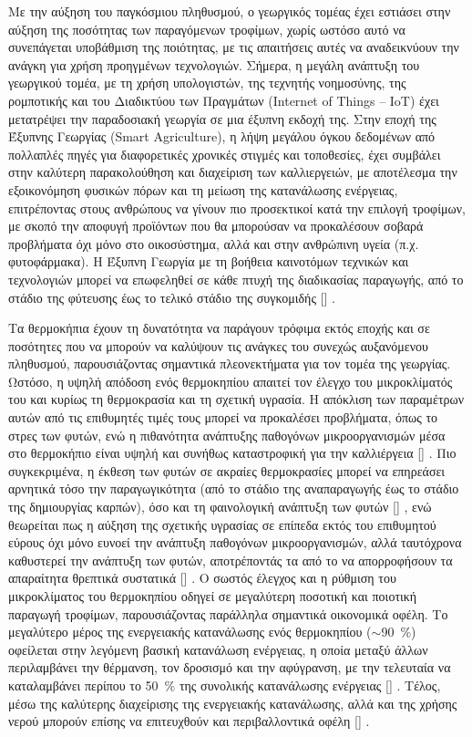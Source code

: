 \documentclass[12pt, a4paper]{report} %
\DeclareRobustCommand{\lcitep}[1]{%
  \english{[\cite{#1}]}%
}
\newcommand{\english}{\foreignlanguage{english}}
\begin{document}
Με την αύξηση του παγκόσμιου πληθυσμού, ο γεωργικός τομέας έχει εστιάσει στην αύξηση της ποσότητας των 
παραγόμενων τροφίμων, χωρίς ωστόσο αυτό να συνεπάγεται υποβάθμιση της ποιότητας, με τις απαιτήσεις αυτές 
να αναδεικνύουν την ανάγκη για χρήση προηγμένων τεχνολογιών. Σήμερα, η μεγάλη ανάπτυξη του γεωργικού τομέα, 
με τη χρήση υπολογιστών, της τεχνητής νοημοσύνης, της ρομποτικής και του Διαδικτύου των Πραγμάτων 
(\english{Internet of Things – IoT}) έχει μετατρέψει την παραδοσιακή γεωργία σε μια έξυπνη εκδοχή της. 
Στην εποχή της Έξυπνης Γεωργίας (\english{Smart Agriculture}), η λήψη μεγάλου όγκου δεδομένων από πολλαπλές 
πηγές για διαφορετικές χρονικές στιγμές και τοποθεσίες, έχει συμβάλει στην καλύτερη παρακολούθηση και 
διαχείριση των καλλιεργειών, με αποτέλεσμα την εξοικονόμηση φυσικών πόρων και τη μείωση της κατανάλωσης 
ενέργειας, επιτρέποντας στους ανθρώπους να γίνουν πιο προσεκτικοί κατά την επιλογή τροφίμων, με σκοπό την 
αποφυγή προϊόντων που θα μπορούσαν να προκαλέσουν σοβαρά προβλήματα όχι μόνο στο οικοσύστημα, αλλά και στην 
ανθρώπινη υγεία (π.χ. φυτοφάρμακα). Η Έξυπνη Γεωργία με τη βοήθεια καινοτόμων τεχνικών και τεχνολογιών 
μπορεί να επωφεληθεί σε κάθε πτυχή της διαδικασίας παραγωγής, από το στάδιο της φύτευσης έως το τελικό 
στάδιο της συγκομιδής \lcitep{eisagwgi_NN_bib1}.

Τα θερμοκήπια έχουν τη δυνατότητα να παράγουν τρόφιμα εκτός εποχής και σε ποσότητες που να μπορούν να 
καλύψουν τις ανάγκες του συνεχώς αυξανόμενου πληθυσμού, παρουσιά\-ζοντας σημαντικά πλεονεκτήματα για τον τομέα 
της γεωργίας. Ωστόσο, η υψηλή απόδοση ενός θερμοκηπίου απαιτεί τον έλεγχο του μικροκλίματός του και κυρίως 
τη θερμοκρασία και τη σχετική υγρασία. Η απόκλιση των παραμέτρων αυτών από τις επιθυμητές τιμές τους 
μπορεί να προκαλέσει προβλήματα, όπως το στρες των φυτών, ενώ η πιθανότητα ανάπτυξης παθογόνων 
μικροοργανισμών μέσα στο θερμοκήπιο είναι υψηλή και συνήθως καταστροφική για την καλλιέργεια 
\lcitep{eisagwgi_NN_bib2,eisagwgi_NN_bib3}. Πιο συγκεκριμένα, η έκθεση των φυτών σε ακραίες θερμοκρασίες 
μπορεί να επηρεάσει αρνητικά τόσο την παραγωγικότητα (από το στάδιο της αναπαραγωγής έως το στάδιο της 
δημιουργίας καρπών), όσο και τη φαινολογική ανάπτυξη των φυτών \lcitep{eisagwgi_NN_bib4,eisagwgi_NN_bib5}, 
ενώ θεωρείται πως η αύξηση της σχετικής υγρασίας σε επίπεδα εκτός του επιθυμητού εύρους όχι μόνο ευνοεί την 
ανάπτυξη παθογόνων μικροοργανισμών, αλλά ταυτόχρονα καθυστερεί την ανάπτυξη των φυτών, αποτρέποντάς τα από 
το να απορροφήσουν τα απαραίτητα θρεπτικά συστατικά \lcitep{eisagwgi_NN_bib4}. Ο σωστός έλεγχος και η ρύθμιση 
του μικροκλίματος του θερμοκηπίου οδηγεί σε μεγαλύτερη ποσοτική και ποιοτική παραγωγή τροφίμων, 
παρουσιάζοντας παράλληλα σημαντικά οικονομικά οφέλη. Το μεγαλύτερο μέρος της ενεργειακής κατανάλωσης ενός 
θερμοκηπίου ($\sim$\SI{90}{\percent}) οφείλεται στην λεγόμενη βασική κατανάλωση ενέργειας, η οποία μεταξύ 
άλλων περιλαμβάνει την θέρμανση, τον δροσισμό και την αφύγρανση, με την τελευταία να καταλαμβάνει περίπου το 
\SI{50}{\percent} της συνολικής κατανάλωσης ενέργειας \lcitep{eisagwgi_NN_bib6}. Τέλος, μέσω της καλύτερης 
διαχείρισης της ενεργειακής κατανάλωσης, αλλά και της χρήσης νερού μπορούν επίσης να επιτευχθούν 
και περιβαλλοντικά οφέλη \lcitep{eisagwgi_NN_bib5}.
\end{document}
